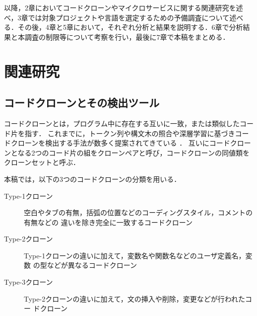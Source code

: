 \documentclass[T,J]{fose}
\begin{document}
以降，2章においてコードクローンやマイクロサービスに関する関連研究を述べ，3章では対象プロジェクトや言語を選定するための予備調査について述べる．その後，4章と5章において，それぞれ分析と結果を説明する．6章で分析結果と本調査の制限等について考察を行い，最後に7章で本稿をまとめる．


\section{関連研究}
\subsection{コードクローンとその検出ツール} \label{subsec:clone}


コードクローンとは，プログラム中に存在する互いに一致，または類似したコード片を指す\cite{コードクローン検出法}．
これまでに，トークン列や構文木の照合や深層学習に基づきコードクローンを検出する手法が数多く提案されてきている \cite{DECKARD,CCFinder,クローンタイプ,CCFinderSW,svajlenko2014evaluating,astnn}．
互いにコードクローンとなる2つのコード片の組をクローンペアと呼び，コードクローンの同値類をクローンセットと呼ぶ．
\par
本稿では，以下の3つのコードクローンの分類を用いる\cite{クローンタイプ}．
\begin{description}
    \item[Type-1クローン] 空白やタブの有無，括弧の位置などのコーディングスタイル，コメントの有無などの
違いを除き完全に一致するコードクローン
    \item[Type-2クローン] Type-1クローンの違いに加えて，変数名や関数名などのユーザ定義名，変数
の型などが異なるコードクローン
    \item[Type-3クローン] Type-2クローンの違いに加えて，文の挿入や削除，変更などが行われたコー
ドクローン
\end{description}
\end{document}
